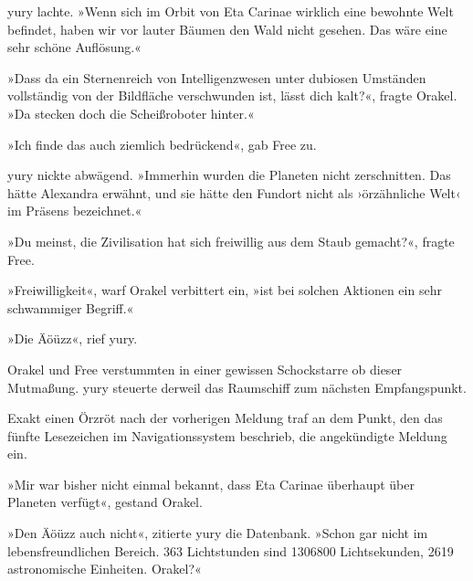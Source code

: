 yury lachte. »Wenn sich im Orbit von Eta Carinae wirklich eine bewohnte Welt befindet, haben wir vor lauter Bäumen den Wald nicht gesehen. Das wäre eine sehr schöne Auflösung.«

»Dass da ein Sternenreich von Intelligenzwesen unter dubiosen Umständen vollständig von der Bildfläche verschwunden ist, lässt dich kalt?«, fragte Orakel. »Da stecken doch die Scheißroboter hinter.«

»Ich finde das auch ziemlich bedrückend«, gab Free zu.

yury nickte abwägend. »Immerhin wurden die Planeten nicht zerschnitten. Das hätte Alexandra erwähnt, und sie hätte den Fundort nicht als ›örzähnliche Welt‹ im Präsens bezeichnet.«

»Du meinst, die Zivilisation hat sich freiwillig aus dem Staub gemacht?«, fragte Free.

»Freiwilligkeit«, warf Orakel verbittert ein, »ist bei solchen Aktionen ein sehr schwammiger Begriff.«

»Die Äöüzz«, rief yury.

Orakel und Free verstummten in einer gewissen Schockstarre ob dieser Mutmaßung. yury steuerte derweil das Raumschiff zum nächsten Empfangspunkt.

\cleardoubleevenpage



Exakt einen Örzröt nach der vorherigen Meldung traf an dem Punkt, den das fünfte Lesezeichen im Navigationssystem beschrieb, die angekündigte Meldung ein.


»Mir war bisher nicht einmal bekannt, dass Eta Carinae überhaupt über Planeten verfügt«, gestand Orakel.

»Den Äöüzz auch nicht«, zitierte yury die Datenbank. »Schon gar nicht im lebensfreundlichen Bereich. 363 Lichtstunden sind 1306800 Lichtsekunden, 2619 astronomische Einheiten. Orakel?«

